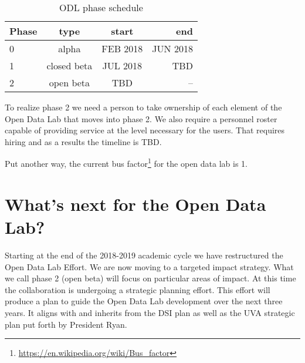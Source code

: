 \begin{table}
\begin{center}
\begin{tabular}{lccr}
\hline
\hline
Phase & type & start & end \\
\hline
0 & alpha & FEB 2018 & JUN 2018\\
1 & closed beta & JUL 2018 & TBD \\
2 & open beta & TBD & -- \\
\hline
\hline
\end{tabular}
\caption{ODL phase schedule}
\end{center}
\end{table}

To realize phase 2 we need a person to take ownership of each element of the Open Data Lab that moves into phase 2. We also require a personnel roster capable of providing service at the level necessary for the users. That requires hiring and as a results the timeline is TBD.

Put another way, the current bus factor\footnote{\url{https://en.wikipedia.org/wiki/Bus_factor}} for the open data lab is 1.

\section{What's next for the Open Data Lab?}
Starting at the end of the 2018-2019 academic cycle we have restructured the Open Data Lab Effort. We are now moving to a targeted impact strategy. What we call phase 2 (open beta) will focus on particular areas of impact. At this time the collaboration is undergoing a strategic planning effort. This effort will produce a plan to guide the Open Data Lab development over the next three years. It aligns with and inherits from the DSI plan as well as the UVA strategic plan put forth by President Ryan.

